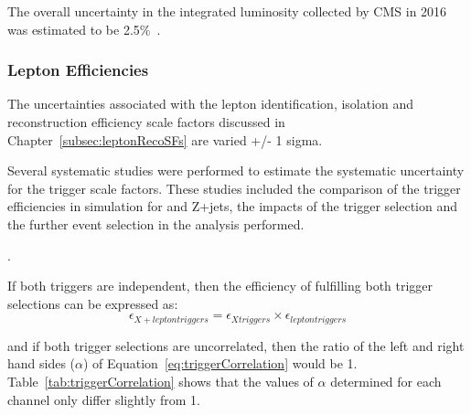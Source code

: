 The overall uncertainty in the integrated luminosity collected by CMS in 2016 was estimated to be 2.5\%~\cite{CMS:2017_lumi}.


\subsubsection{Lepton Efficiencies}
The uncertainties associated with the lepton identification, isolation and reconstruction efficiency scale factors discussed in Chapter~\ref{subsec:leptonRecoSFs} are varied +/- 1 sigma.

Several systematic studies were performed to estimate the systematic uncertainty for the trigger scale factors.
These studies included the comparison of the trigger efficiencies in simulation for \ttbar and Z+jets, the impacts of the \MET trigger selection and the further event selection in the analysis performed. 

.


If both triggers are independent, then the efficiency of fulfilling both trigger selections can be expressed as:
\begin{equation}
\epsilon_{X + lepton triggers} = \epsilon_{X triggers} \times \epsilon_{lepton triggers}
\label{eq:triggerCorrelation}
\end{equation}

and if both trigger selections are uncorrelated, then the ratio of the left and right hand sides ($\alpha$) of Equation~\ref{eq:triggerCorrelation} would be 1.
Table~\ref{tab:triggerCorrelation} shows that the values of $\alpha$ determined for each channel only differ slightly from 1.


\begin{table}[htbp]
\label{tab:triggerCorrelation}
  \centering
\end{table}

